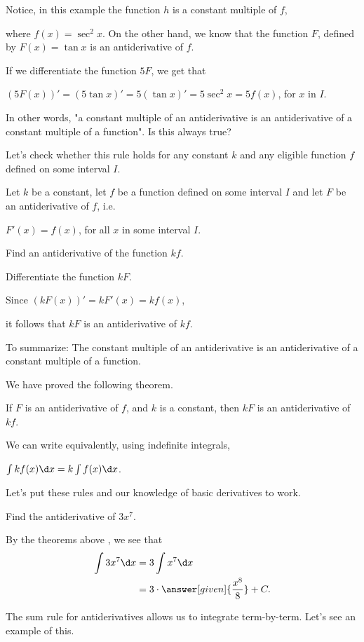 \documentclass{ximera}
\begin{document}
Notice, in this example the function $h$ is a constant multiple of $f$, 

where $f(x)=\sec^{2}{x}$. On the other hand, we know that the function $F$, defined by 
$F(x)=\tan{x}$ is an antiderivative of $f$.

If we  differentiate the function $5F$, we get that

  $\left(5F(x)\right)'=\left(5\tan{x}\right)'=5\left(\tan{x}\right)'=5\sec^{2}{x}=5f(x)$, for $x$ in $I$.
  
  In other words, "a constant multiple of an antiderivative is an antiderivative of a constant multiple of a function".
Is this always true?

Let's check whether this rule holds for  any constant $k$ and any eligible  function $f$ defined on some interval $I$.
 \begin{question}
Let $k$ be a constant, let $f$ be a function defined on some interval $I$ and let $F$ be an antiderivative of $f$, i.e.

$F'(x)=f(x)$, for all  $x$ in some interval $I$.

  Find an antiderivative of the function $k f$.
    \begin{hint}
    Differentiate the function $kF$.
     \end{hint}
     Since
     $\left(kF(x)\right)'=kF'(x)=kf(x)$,
     
     
   it follows that  $kF$ is an antiderivative of $kf$. 
 
 To summarize: The constant multiple of an antiderivative is an antiderivative of a constant multiple of a function. 
\end{question}
We have proved the following theorem.
\begin{theorem}\label{theorem:CFRA}
If $F$ is an antiderivative of $f$, and $k$ is a constant, then $kF$
is an antiderivative of $kf$.

We can write equivalently, using indefinite integrals, 

$\int kf(x) \d x= k\int f(x)\d x$.
\end{theorem}
Let's put these rules and our knowledge of basic derivatives to work.
\begin{example}
Find the antiderivative of $3 x^7$.
\begin{explanation}
By the theorems above , we see that
\begin{align*}
\int 3 x^7 \d x &= 3 \int x^7 \d x\\
&= 3 \cdot \answer[given]{\frac{x^8}{8}}+C.
\end{align*}
\end{explanation}
\end{example}
The sum rule for antiderivatives allows us to integrate
term-by-term. Let's see an example of this.
\end{document}
